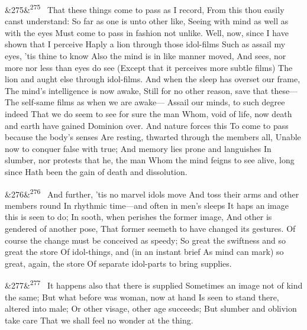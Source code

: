 \documentclass[12pt]{article}
\newcommand{\para}[1][]{\par\noindent\ifx&#1&\else\textsuperscript{\footnotesize #1}~\fi}
\begin{document}
\para[275] That these things come to pass as I record, From this thou easily canst understand: So far as one is unto other like, Seeing with mind as well as with the eyes Must come to pass in fashion not unlike. Well, now, since I have shown that I perceive Haply a lion through those idol-films Such as assail my eyes, 'tis thine to know Also the mind is in like manner moved, And sees, nor more nor less than eyes do see (Except that it perceives more subtle films) The lion and aught else through idol-films. And when the sleep has overset our frame, The mind's intelligence is now awake, Still for no other reason, save that these--- The self-same films as when we are awake--- Assail our minds, to such degree indeed That we do seem to see for sure the man Whom, void of life, now death and earth have gained Dominion over. And nature forces this To come to pass because the body's senses Are resting, thwarted through the members all, Unable now to conquer false with true; And memory lies prone and languishes In slumber, nor protests that he, the man Whom the mind feigns to see alive, long since Hath been the gain of death and dissolution.

\para[276] And further, 'tis no marvel idols move And toss their arms and other members round In rhythmic time---and often in men's sleeps It haps an image this is seen to do; In sooth, when perishes the former image, And other is gendered of another pose, That former seemeth to have changed its gestures. Of course the change must be conceived as speedy; So great the swiftness and so great the store Of idol-things, and (in an instant brief As mind can mark) so great, again, the store Of separate idol-parts to bring supplies.

\para[277] It happens also that there is supplied Sometimes an image not of kind the same; But what before was woman, now at hand Is seen to stand there, altered into male; Or other visage, other age succeeds; But slumber and oblivion take care That we shall feel no wonder at the thing.
\end{document}
